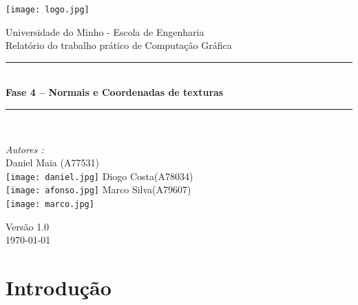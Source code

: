\documentclass[a4paper]{article}
\begin{document}
\begin{titlepage}
\begin{center}


\texttt{[image: logo.jpg]}\\[0.5cm]

\vspace{10mm}

{\huge Universidade do Minho - Escola de Engenharia}\\[0.5cm]

{\large Relatório do trabalho prático de Computação Gráfica}\\[0.5cm]

\vspace{10mm} 

\rule{\linewidth}{0.5mm} \\[0.4cm]
{ \huge \bfseries Fase 4 – Normais e Coordenadas de texturas \\[0.4cm] }
\rule{\linewidth}{0.5mm} \\[1.5cm]

\noindent
\begin{minipage}{0.4\textwidth}
  \begin{flushleft} \large
    \emph{Autores :}\\
    Daniel Maia \textsc{(A77531)}\\
    \texttt{[image: daniel.jpg]}\break
    Diogo Costa\textsc{(A78034)}\\
    \texttt{[image: afonso.jpg]}\break
    Marco Silva\textsc{(A79607)}\\
    \texttt{[image: marco.jpg]}\break
  \end{flushleft}
\end{minipage}%
\vfill

{\large Versão 1.0 \\ \today}

\end{center}
\end{titlepage}


\begin{abstract}

\hspace{3mm} 

\end{abstract}

\pagebreak
\tableofcontents

\pagebreak

\section{Introdução}
\end{document}
